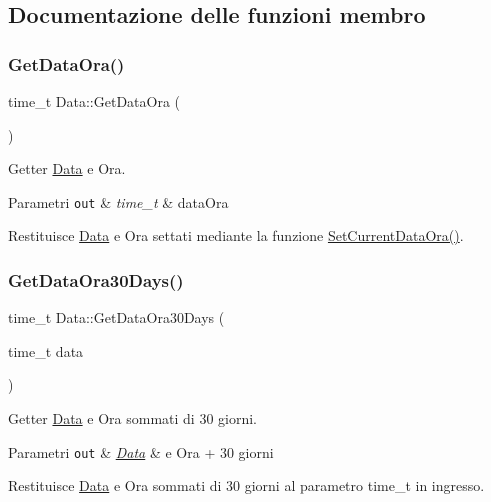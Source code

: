 \subsection{Documentazione delle funzioni membro}
\mbox{\label{class_data_ab27ede34460ad63d6e3ee2567b3be0d9}} 
\subsubsection{\texorpdfstring{Get\+Data\+Ora()}{GetDataOra()}}
{\footnotesize\ttfamily time\+\_\+t Data\+::\+Get\+Data\+Ora (\begin{DoxyParamCaption}{ }\end{DoxyParamCaption})}



Getter \mbox{\hyperlink{class_data}{Data}} e Ora. 


\begin{DoxyParams}[1]{Parametri}
\mbox{\tt out}  & {\em time\+\_\+t} & data\+Ora\\
\hline
\end{DoxyParams}
Restituisce \mbox{\hyperlink{class_data}{Data}} e Ora settati mediante la funzione \mbox{\hyperlink{class_data_a0f77e10131654f6588e1ed935c8b5926}{Set\+Current\+Data\+Ora()}}. \mbox{\label{class_data_aaf254a17c4ad07af79effbd50df887d7}} 
\subsubsection{\texorpdfstring{Get\+Data\+Ora30\+Days()}{GetDataOra30Days()}}
{\footnotesize\ttfamily time\+\_\+t Data\+::\+Get\+Data\+Ora30\+Days (\begin{DoxyParamCaption}\item[{time\+\_\+t}]{data }\end{DoxyParamCaption})}



Getter \mbox{\hyperlink{class_data}{Data}} e Ora sommati di 30 giorni. 


\begin{DoxyParams}[1]{Parametri}
\mbox{\tt out}  & {\em \mbox{\hyperlink{class_data}{Data}}} & e Ora + 30 giorni\\
\hline
\end{DoxyParams}
Restituisce \mbox{\hyperlink{class_data}{Data}} e Ora sommati di 30 giorni al parametro time\+\_\+t in ingresso. \mbox{\label{class_data_a67b1a6fc8bdd632c2bd582206df3c0b7}} 
